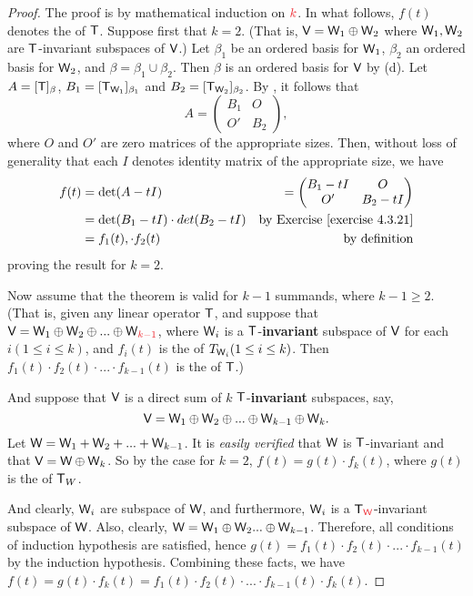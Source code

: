 \begin{proof}
The proof is by mathematical induction on \(\RED{k}\).
In what follows, \(f(t)\) denotes the \CPOLY{} of \(\textsf{T}\).
Suppose first that \(k = 2\).
(That is, \(\textsf{V} = \textsf{W}_1 \oplus \textsf{W}_2\) where \(\textsf{W}_1, \textsf{W}_2\) are \(\textsf{T}\)-invariant subspaces of \(\textsf{V}\).)
Let \(\beta_1\) be an ordered basis for \(\textsf{W}_1\), \(\beta_2\) an ordered basis for \(\textsf{W}_2\), and \(\beta = \beta_1 \cup \beta_2\).
Then \(\beta\) is an ordered basis for \(\textsf{V}\) by (d).
Let \(A = [\textsf{T}]_{\beta}\), \(B_1 = [\textsf{T}_{\textsf{W}_1}]_{\beta_1}\) and \(B_2 = [\textsf{T}_{\textsf{W}_2}]_{\beta_2}\).
By , it follows that
\[
    A = \begin{pmatrix}
        B_1 & O \\
        O' & B_2
    \end{pmatrix},
\]
where \(O\) and \(O'\) are zero matrices of the appropriate sizes.
Then, without loss of generality that each \(I\) denotes identity matrix of the appropriate size, we have
\begin{align*}
    f(t) & = \det(A - tI) & = \begin{pmatrix} B_1 - tI & O \\ O' & B_2 - tI \end{pmatrix}\\
         & = \det(B_1 - tI) \cdot det(B_2 - tI) & \text{by \EXEC{4.3.21}} \\
         & = f_1(t), \cdot f_2(t) & \text{by definition}
\end{align*}
proving the result for \(k = 2\).

Now assume that the theorem is valid for \(k - 1\) summands, where \(k - 1 \ge 2\).
(That is, given any linear operator \(\textsf{T}\), and suppose that \(\V = \W_1 \oplus \W_2 \oplus ... \oplus \W_{\RED{k - 1}}\), where \(\textsf{W}_i\) is a \(\textsf{T}\)-\textbf{invariant} subspace of \(\textsf{V}\) for each \(i (1 \le i \le k)\), and \(f_i(t)\) is the \CPOLY{} of \(T_{\textsf{W}_i} (1 \le i \le k)\).
Then \(f_1(t) \cdot f_2(t) \cdot ... \cdot f_{k - 1}(t)\) is the \CPOLY{} of \(\textsf{T}\).)

And suppose that \(\textsf{V}\) is a direct sum of \(k\) \(\textsf{T}\)-\textbf{invariant}\RED{*} subspaces, say,
\[
    \textsf{V} = \textsf{W}_1 \oplus \textsf{W}_2 \oplus ... \oplus \textsf{W}_{k - 1} \oplus \textsf{W}_k.
\]
Let \(\textsf{W} = \textsf{W}_1 + \textsf{W}_2 + ... + \textsf{W}_{k - 1}\).
It is \emph{easily verified} that \(\textsf{W}\) is \(\textsf{T}\)-invariant and that \(\textsf{V} = \textsf{W} \oplus \textsf{W}_k\).
So by the case for \(k = 2\), \(f(t) = g(t) \cdot f_k(t)\), where \(g(t)\) is the \CPOLY{} of \(\textsf{T}_W\).

\RED{**}And clearly, \(\textsf{W}_i\) are subspace of \(\textsf{W}\), and furthermore, \(\textsf{W}_i\) is a \(\T_{\RED{\W}}\)-invariant subspace of \(\textsf{W}\).
Also, clearly, \(\textsf{W} = \textsf{W}_1 \oplus \textsf{W}_2 ... \oplus \textsf{W}_{k - 1}\).
Therefore, all conditions of induction hypothesis are satisfied, hence \(g(t) = f_1(t) \cdot f_2(t) \cdot ... \cdot f_{k - 1}(t)\) by the induction hypothesis.
Combining these facts, we have \(f(t) = g(t) \cdot f_k(t) = f_1(t) \cdot f_2(t) \cdot ... \cdot f_{k - 1}(t) \cdot f_k(t)\).
\end{proof}

